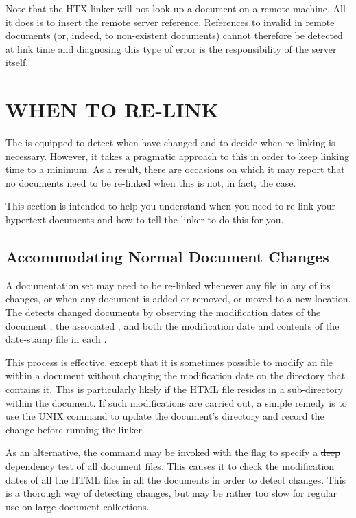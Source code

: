 Note that the HTX linker will not look up a document on a remote
machine. All it does is to insert the remote server reference.
References to invalid  in remote documents (or, indeed,
to non-existent documents) cannot therefore be detected at link time
and diagnosing this type of error is the responsibility of the server
itself.

\section{WHEN TO RE-LINK}

The   is equipped to detect when
 have changed and to decide when re-linking is
necessary. However, it takes a pragmatic approach to this in order to
keep linking time to a minimum. As a result, there are occasions on
which it may report that no documents need to be re-linked when this
is not, in fact, the case.

This section is intended to help you understand when you need to
re-link your hypertext documents and how to tell the
linker to do this for you.

\subsection{Accommodating Normal Document Changes}

A documentation set may need to be re-linked whenever any file in any
of its  changes, or when any document is added or
removed, or moved to a new location.  The 
 detects changed documents by observing the
modification dates of the document , the
associated , and both the modification date and
contents of the  date-stamp file in each .

This process is effective, except that it is sometimes possible to
modify an  file within a document without changing the
modification date on the  directory that contains it. This is
particularly likely if the HTML file resides in a sub-directory within
the document. If such modifications are carried out, a simple remedy
is to use the UNIX  command to update the document's
 directory and record the change before running the linker.

As an alternative, the  command may be invoked with the
 flag to specify a \st{deep dependency} test of all document
files. This causes it to check the modification dates of all the HTML
files in all the documents in order to detect changes. This is a
thorough way of detecting changes, but may be rather too slow for
regular use on large document collections.

